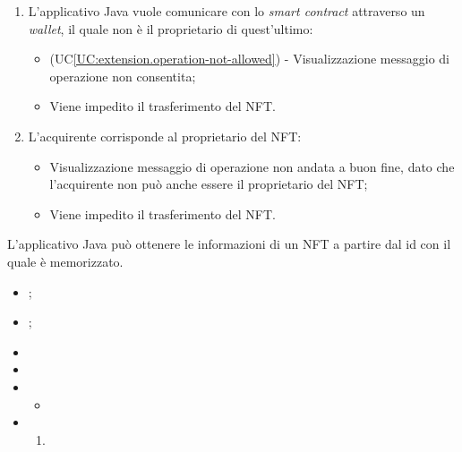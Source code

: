 \begin{itemize}
\begin{enumerate}[label=\lett]
    \item L'applicativo Java vuole comunicare con lo \textit{smart contract} attraverso un \textit{wallet}, il quale non è il proprietario di quest'ultimo:
    \begin{itemize}
      \item (UC\ref{UC:extension.operation-not-allowed}) - Visualizzazione messaggio di operazione non consentita;
      \item Viene impedito il trasferimento del NFT.
    \end{itemize}

    \item L'acquirente corrisponde al proprietario del NFT:
    \begin{itemize}
      \item Visualizzazione messaggio di operazione non andata a buon fine, dato che l'acquirente non può anche essere il proprietario del NFT;
      \item Viene impedito il trasferimento del NFT.
    \end{itemize}
  \end{enumerate}
\end{itemize}

L'applicativo Java può ottenere le informazioni di un NFT a partire dal id con il quale è memorizzato.

\begin{itemize}
  \item {};
  \item {};
  \item \UCPre{}
  \item \UCPost{}
  
  \item \UCMain{}
  \begin{itemize}
    \item 
  \end{itemize}
  
  \item \UCExt{}
  \begin{enumerate}[label=\lett]
    \item 
  \end{enumerate}
\end{itemize}

